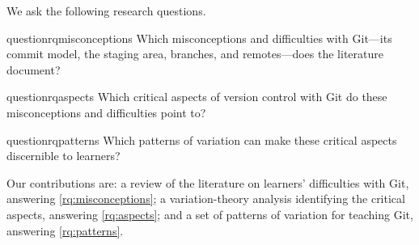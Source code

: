 We ask the following research questions.

\begin{frame}
\begin{restatable}{question}{rqmisconceptions}\label{rq:misconceptions}
  Which misconceptions and difficulties with Git---its commit model, the
  staging area, branches, and remotes---does the literature document?
\end{restatable}

\begin{restatable}{question}{rqaspects}\label{rq:aspects}
  Which critical aspects of version control with Git do these
  misconceptions and difficulties point to?
\end{restatable}

\begin{restatable}{question}{rqpatterns}\label{rq:patterns}
  Which patterns of variation can make these critical aspects discernible
  to learners?
\end{restatable}
\end{frame}

Our contributions are:
a review of the literature on learners' difficulties with Git, answering
\cref{rq:misconceptions};
a variation-theory analysis identifying the critical aspects, answering
\cref{rq:aspects};
and a set of patterns of variation for teaching Git, answering
\cref{rq:patterns}.
